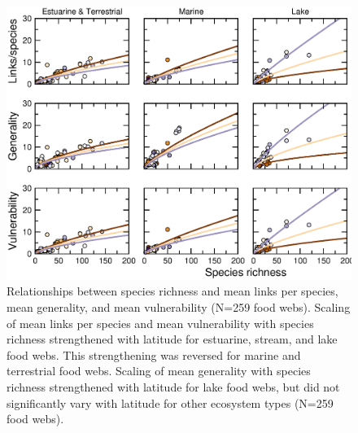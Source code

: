 \documentclass[12pt]{article}
\begin{document}
\begin{figure}[!h]
\label{scalingfig}
\includegraphics[width=.9\textwidth]{Figures/scaling_with_S_grey.eps}
\caption{Relationships between species richness and mean links per species, mean generality, and mean 
vulnerability (N=259 food webs). Scaling of mean links per species and mean vulnerability with species 
richness strengthened with latitude for estuarine, stream, and lake food webs. This strengthening was
reversed for marine and terrestrial food webs. Scaling of mean generality with species richness 
strengthened with latitude for lake food webs, but did not significantly vary with latitude for other
ecosystem types (N=259 food webs). }
\end{figure}
\end{document}
